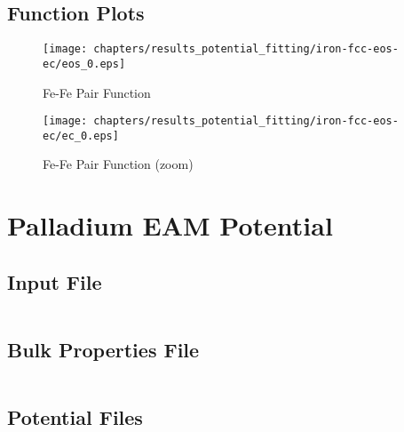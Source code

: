 \FloatBarrier
\subsection{Function Plots}

\begin{figure}[ht] 
  \begin{minipage}[b]{0.5\linewidth}
    \centering
    \texttt{[image: chapters/results\_potential\_fitting/iron-fcc-eos-ec/eos\_0.eps]} 
    \caption{Fe-Fe Pair Function} 
  \end{minipage}
  \begin{minipage}[b]{0.5\linewidth}
    \centering
    \texttt{[image: chapters/results\_potential\_fitting/iron-fcc-eos-ec/ec\_0.eps]} 
    \caption{Fe-Fe Pair Function (zoom)} 
  \end{minipage} 
  \label{fig:ironPotentialPlots} 
\end{figure}


\FloatBarrier










\section{Palladium EAM Potential}


\subsection{Input File}

\begin{lstlisting}[style=sPseudo,caption={Palladium potential input file for fitting.}]
\end{lstlisting}



\subsection{Bulk Properties File}

\begin{lstlisting}[style=sPseudo,caption={Bulk properties file for fitting.}]
\end{lstlisting}

\subsection{Potential Files}

